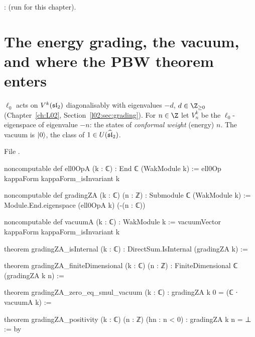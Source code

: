 \begin{status}
\allowbreak{}\allowbreak{}\allowbreak{}: \lean{[propext, Classical.}\allowbreak{}\allowbreak\lean{sound]} (run for this
chapter).
\end{status}

\section{The energy grading, the vacuum, and where the PBW theorem enters}\label{l08:sec:grading}

\begin{definition}\label{l08:def:grading}
$\ell_0$ acts on $V^k(\mathfrak{sl}_2)$ diagonalisably with eigenvalues $-d$, $d\in\Z_{\ge0}$
(Chapter~\ref{ch:L02}, Section~\ref{l02:sec:grading}). For $n\in\Z$ let $V^k_n$ be the
$\ell_0$-eigenspace of eigenvalue $-n$: the states of \emph{conformal weight} (energy) $n$. The vacuum
is $|0\rangle$, the class of $1\in U(\widehat{\mathfrak{sl}}_2)$.
\end{definition}

\noindent File .
\begin{leancode}
noncomputable def ell0OpA (k : ℂ) : End ℂ (WakModule k) :=
  ell0Op kappaForm kappaForm_isInvariant k

noncomputable def gradingZA (k : ℂ) (n : ℤ) : Submodule ℂ (WakModule k) :=
  Module.End.eigenspace (ell0OpA k) (-(n : ℂ))

noncomputable def vacuumA (k : ℂ) : WakModule k :=
  vacuumVector kappaForm kappaForm_isInvariant k

theorem gradingZA_isInternal (k : ℂ) : DirectSum.IsInternal (gradingZA k) :=

theorem gradingZA_finiteDimensional (k : ℂ) (n : ℤ) :
    FiniteDimensional ℂ (gradingZA k n) :=

theorem gradingZA_zero_eq_smul_vacuum (k : ℂ) :
    gradingZA k 0 = (ℂ ∙ vacuumA k) :=

theorem gradingZA_positivity (k : ℂ) (n : ℤ) (hn : n < 0) : gradingZA k n = ⊥ := by
\end{leancode}

